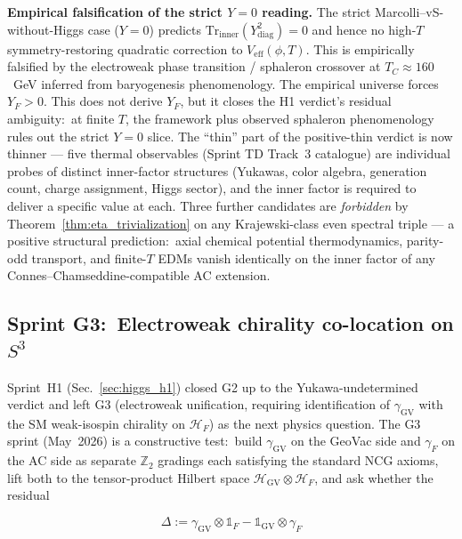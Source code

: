 \documentclass[11pt]{article}
\begin{document}
\textbf{Empirical falsification of the strict $Y = 0$ reading.}
The strict Marcolli--vS-without-Higgs case ($Y = 0$) predicts
$\mathrm{Tr}_{\mathrm{inner}}(Y_{\mathrm{diag}}^2) = 0$ and hence
no high-$T$ symmetry-restoring quadratic correction to
$V_{\mathrm{eff}}(\phi, T)$.  This is empirically falsified by the
electroweak phase transition / sphaleron crossover at
$T_C \approx 160$~GeV inferred from baryogenesis phenomenology.  The
empirical universe forces $Y_F > 0$.  This does not derive $Y_F$,
but it closes the H1 verdict's residual ambiguity:\ at finite $T$,
the framework plus observed sphaleron phenomenology rules out the
strict $Y = 0$ slice.  The ``thin'' part of the positive-thin
verdict is now thinner --- five thermal observables (Sprint TD
Track~3 catalogue) are individual probes of distinct inner-factor
structures (Yukawas, color algebra, generation count, charge
assignment, Higgs sector), and the inner factor is required to
deliver a specific value at each.  Three further candidates are
\emph{forbidden} by Theorem~\ref{thm:eta_trivialization} on any
Krajewski-class even spectral triple --- a positive structural
prediction:\ axial chemical potential thermodynamics, parity-odd
transport, and finite-$T$ EDMs vanish identically on the inner
factor of any Connes--Chamseddine-compatible AC extension.

\subsection{Sprint G3:\ Electroweak chirality co-location on $S^3$}
\label{sec:g3}

Sprint~H1 (Sec.~\ref{sec:higgs_h1}) closed G2 up to the
Yukawa-undetermined verdict and left G3 (electroweak unification,
requiring identification of $\gamma_{\mathrm{GV}}$ with the SM
weak-isospin chirality on $\mathcal{H}_F$) as the next physics
question.  The G3 sprint (May~2026) is a constructive test:\ build
$\gamma_{\mathrm{GV}}$ on the GeoVac side and $\gamma_F$ on the AC
side as separate $\mathbb{Z}_2$ gradings each satisfying the
standard NCG axioms, lift both to the tensor-product Hilbert space
$\mathcal{H}_{\mathrm{GV}} \otimes \mathcal{H}_F$, and ask whether
the residual

\begin{equation}
\Delta := \gamma_{\mathrm{GV}} \otimes \mathbb{1}_F -
          \mathbb{1}_{\mathrm{GV}} \otimes \gamma_F
\end{equation}
\end{document}
